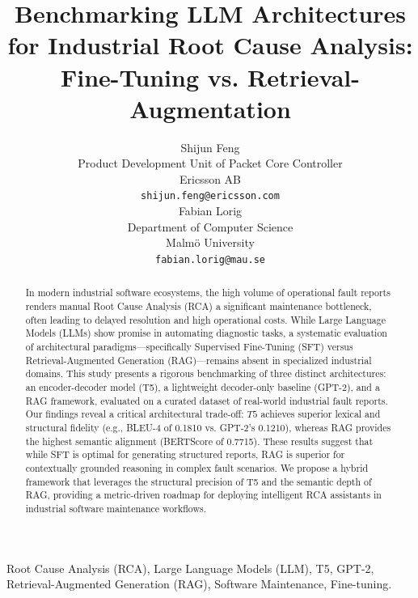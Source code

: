 \documentclass[10pt,twocolumn,journal]{IEEEtran}
\begin{document}
\title{Benchmarking LLM Architectures for Industrial Root Cause Analysis: Fine-Tuning vs. Retrieval-Augmentation}
\author{
\begin{minipage}{0.45\textwidth}
\centering
Shijun Feng\\
Product Development Unit of Packet Core Controller\\
Ericsson AB\\
\texttt{shijun.feng@ericsson.com}
\end{minipage}
\hfill
\begin{minipage}{0.45\textwidth}
\centering
Fabian Lorig\\
Department of Computer Science\\
Malmö University\\
\texttt{fabian.lorig@mau.se}
\end{minipage}
}
\maketitle
\begin{abstract}
In modern industrial software ecosystems, the high volume of operational fault reports renders manual Root Cause Analysis (RCA) a significant maintenance bottleneck, often leading to delayed resolution and high operational costs. While Large Language Models (LLMs) show promise in automating diagnostic tasks, a systematic evaluation of architectural paradigms—specifically Supervised Fine-Tuning (SFT) versus Retrieval-Augmented Generation (RAG)—remains absent in specialized industrial domains. This study presents a rigorous benchmarking of three distinct architectures: an encoder-decoder model (T5), a lightweight decoder-only baseline (GPT-2), and a RAG framework, evaluated on a curated dataset of real-world industrial fault reports. Our findings reveal a critical architectural trade-off: $T5$ achieves superior lexical and structural fidelity (e.g., BLEU-4 of 0.1810 vs. GPT-2’s 0.1210), whereas RAG provides the highest semantic alignment (BERTScore of 0.7715). These results suggest that while SFT is optimal for generating structured reports, RAG is superior for contextually grounded reasoning in complex fault scenarios. We propose a hybrid framework that leverages the structural precision of T5 and the semantic depth of RAG, providing a metric-driven roadmap for deploying intelligent RCA assistants in industrial software maintenance workflows.
\end{abstract}

\begin{IEEEkeywords}
Root Cause Analysis (RCA), Large Language Models (LLM), T5, GPT-2, Retrieval-Augmented Generation (RAG), Software Maintenance, Fine-tuning.
\end{IEEEkeywords}
\end{document}
